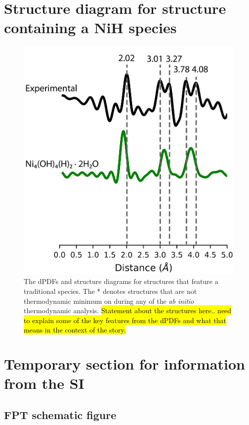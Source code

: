 \documentclass[12pt]{article}
\begin{document}
\section{Structure diagram for structure containing a NiH species}
\begin{figure}[H]
    \centering
    \includegraphics{zi-images/04-SI-images/2021-05-10-Ni-single-dPDF-Ni-H.png}
    \caption{
    The dPDFs and structure diagrams for structures that feature a traditional  species. The * denotes structures that are not thermodynamic minimum on during any of the \textit{ab initio} thermodynamic analysis. \hl{Statement about the structures here.. need to explain some of the key features from the dPDFs and what that means in the context of the story.}
    }
    \label{fig:SI-structure-diagram}
\end{figure}





\newpage
\section{Temporary section for information from the SI}

\subsection{FPT schematic figure}
\end{document}
